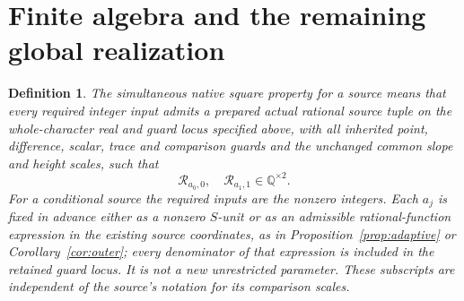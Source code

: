 \documentclass[11pt,a4paper]{article}
\newtheorem{definition}[theorem]{Definition}
\newcommand{\Q}{\mathbb Q}\newcommand{\Z}{\mathbb Z}
\begin{document}
\section{Finite algebra and the remaining global realization}

\begin{definition}\label{def:realization}
The simultaneous native square property for a source means that every
required integer input admits a prepared actual rational source tuple
on the whole-character real and guard locus specified above, with all
inherited point, difference, scalar, trace and comparison guards and
the unchanged common slope and height scales, such that
\[
                       \mathcal R_{a_0,0},\quad
                       \mathcal R_{a_1,1}\in\Q^{\times2}.
\]
For a conditional source the required inputs are the nonzero integers.
Each $a_j$ is fixed in advance either as a nonzero $S$-unit or as an
admissible rational-function expression in the existing source
coordinates, as in Proposition~\ref{prop:adaptive} or
Corollary~\ref{cor:outer}; every denominator of that expression is
included in the retained guard locus. It is not a new unrestricted
parameter. These subscripts are independent of the source's notation
for its comparison scales.
\end{definition}
\end{document}
